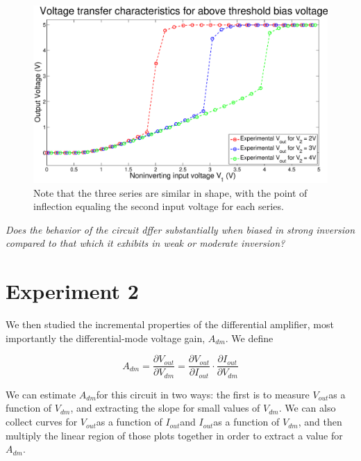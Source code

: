\documentclass{article}
\newcommand{\Vout}{{$V_{out}$}}
\newcommand{\Vdm}{{$V_{dm}$}}
\newcommand{\Iout}{{$I_{out}$}}
\newcommand{\Adm}{{$A_{dm}$}}
\begin{document}
\begin{figure}[H]
\centering
\includegraphics[width=\linewidth]{../Figures/Exp1P3.eps}
\caption{Note that the three series are similar in shape, with the point of inflection equaling the second input voltage for each series.}
\label{fig:exp1p3}
\end{figure}


\textit{Does the behavior of the circuit dffer substantially when biased in strong inversion compared to that which it exhibits in
weak or moderate inversion?}



\section*{Experiment 2}

We then studied the incremental properties of the differential amplifier, most importantly the differential-mode voltage gain, \Adm. We define

\begin{equation}
A_{dm} = \frac{\partial V_{out}}{\partial V_{dm}} = \frac{\partial V_{out} }{\partial I_{out} } \cdot \frac{\partial I_{out}}{\partial V_{dm}}
\label{eq:adm}
\end{equation}

We can estimate \Adm for this circuit in two ways: the first is to measure \Vout as a function of \Vdm, and extracting the slope for small values of \Vdm. We can also collect curves for \Vout as a function of \Iout and \Iout as a function of \Vdm, and then multiply the linear region of those plots together in order to extract a value for \Adm.
\end{document}
